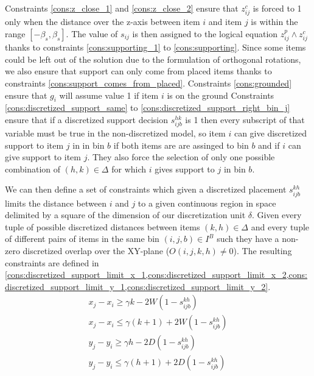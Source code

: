 Constraints \ref{cons:z_close_1} and \ref{cons:z_close_2} ensure that $z^c_{ij}$ is forced to 1 only when the distance over the z-axis between item $i$ and item $j$ is within the range $[-\beta_s, \beta_s]$.
The value of $s_{ij}$ is then assigned to the logical equation $z^p_{ij} \land z^c_{ij}$ thanks to constraints \ref{cons:supporting_1} to \ref{cons:supporting}.
Since some items could be left out of the solution due to the formulation of orthogonal rotations, we also ensure that support can only come from placed items thanks to constraints \ref{cons:support_comes_from_placed}.
Constraints \ref{cons:grounded} ensure that $g_i$ will assume value 1 if item $i$ is on the ground
Constraints \ref{cons:discretized_support_same} to \ref{cons:discretized_support_right_bin_j} ensure that if a discretized support decision $s_{ijb}^{hk}$ is 1 then every subscript of that variable must be true in the non-discretized model, so item $i$ can give discretized support to item $j$ in in bin $b$ if both items are are assinged to bin $b$ and if $i$ can give support to item $j$. They also force the selection of only one possible combination of $(h,k) \in \Delta$ for which $i$ gives support to $j$ in bin $b$.

We can then define a set of constraints which given a discretized placement $s^{k h}_{i j b}$ limits the distance between $i$ and $j$ to a given continuous region in space delimited by a square of the dimension of our discretization unit $\delta$.
Given every tuple of possible discretized distances between items $ (k, h) \in \Delta$ and every tuple of different pairs of items in the same bin $(i, j, b) \in I^B$ such they have a non-zero discretized overlap over the XY-plane ($O(i, j, k, h) \neq 0$).
The resulting constraints are defined in \cref{cons:discretized_support_limit_x_1,cons:discretized_support_limit_x_2,cons:discretized_support_limit_y_1,cons:discretized_support_limit_y_2}.
\begin{align}
    & x_j - x_i \ge \gamma k - 2W( 1 - s^{k h}_{i j b}) &  \label{cons:discretized_support_limit_x_1} \\
    & x_j - x_i \le \gamma (k + 1) + 2W( 1 - s^{k h}_{i j b}) &  \label{cons:discretized_support_limit_x_2} \\
    & y_j - y_i \ge \gamma h - 2D( 1 - s^{k h}_{i j b}) &  \label{cons:discretized_support_limit_y_1} \\
    & y_j - y_i \le \gamma (h + 1) + 2D( 1 - s^{k h}_{i j b}) &  \label{cons:discretized_support_limit_y_2}
\end{align}

